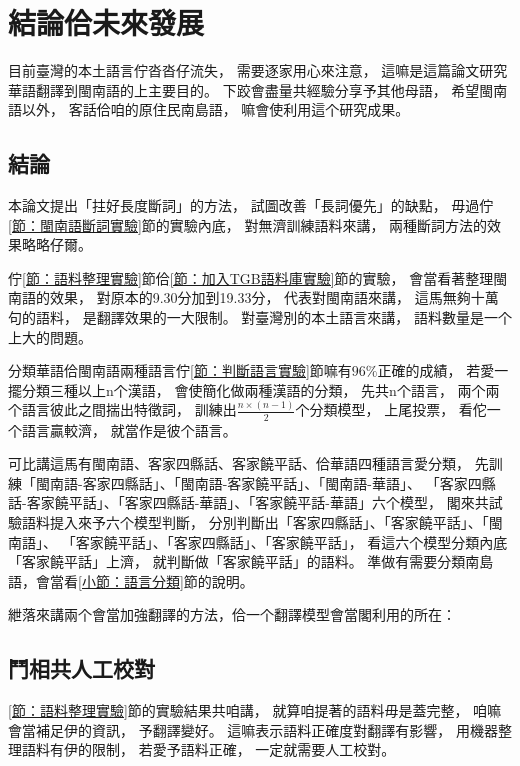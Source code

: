 \chapter{結論佮未來發展}
\label{章：結論佮未來發展}
目前臺灣的本土語言佇沓沓仔流失，
需要逐家用心來注意，
這嘛是這篇論文研究華語翻譯到閩南語的上主要目的。
下跤會盡量共經驗分享予其他母語，
希望閩南語以外，
客話佮咱的原住民南島語，
嘛會使利用這个研究成果。

\section{結論}
\label{節：結論}
本論文提出「拄好長度斷詞」的方法，
試圖改善「長詞優先」的缺點，
毋過佇\ref{節：閩南語斷詞實驗}節的實驗內底，
對無濟訓練語料來講，
兩種斷詞方法的效果略略仔爾。


佇\ref{節：語料整理實驗}節佮\ref{節：加入TGB語料庫實驗}節的實驗，
會當看著整理閩南語的效果，
對原本的9.30分加到19.33分，
代表對閩南語來講，
這馬無夠十萬句的語料，
是翻譯效果的一大限制。
對臺灣別的本土語言來講，
語料數量是一个上大的問題。

分類華語佮閩南語兩種語言佇\ref{節：判斷語言實驗}節嘛有$96\%$正確的成績，
若愛一擺分類三種以上n个漢語，
會使簡化做兩種漢語的分類，
先共n个語言，
兩个兩个語言彼此之間揣出特徵詞，
訓練出$\frac{n\times(n-1)}{2}$个分類模型，
上尾投票，
看佗一个語言贏較濟，
就當作是彼个語言。

可比講這馬有閩南語、客家四縣話、客家饒平話、佮華語四種語言愛分類，
先訓練「閩南語-客家四縣話」、「閩南語-客家饒平話」、「閩南語-華語」、
「客家四縣話-客家饒平話」、「客家四縣話-華語」、「客家饒平話-華語」六个模型，
閣來共試驗語料提入來予六个模型判斷，
分別判斷出「客家四縣話」、「客家饒平話」、「閩南語」、
「客家饒平話」、「客家四縣話」、「客家饒平話」，
看這六个模型分類內底「客家饒平話」上濟，
就判斷做「客家饒平話」的語料。
準做有需要分類南島語，會當看\ref{小節：語言分類}節的說明。

紲落來講兩个會當加強翻譯的方法，佮一个翻譯模型會當閣利用的所在：
\section{鬥相共人工校對}
\label{節：鬥相共人工校對}

\ref{節：語料整理實驗}節的實驗結果共咱講，
就算咱提著的語料毋是蓋完整，
咱嘛會當補足伊的資訊，
予翻譯變好。
這嘛表示語料正確度對翻譯有影響，
用機器整理語料有伊的限制，
若愛予語料正確，
一定就需要人工校對。

